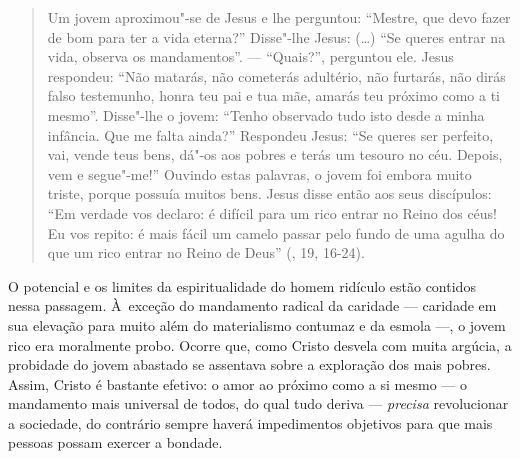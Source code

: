 \begin{quote}
Um jovem aproximou"-se de Jesus e lhe perguntou: ``Mestre, que devo fazer
de bom para ter a vida eterna?'' Disse"-lhe Jesus: (\ldots) ``Se queres
entrar na vida, observa os mandamentos''. --- ``Quais?'', perguntou ele.
Jesus respondeu: ``Não matarás, não cometerás adultério, não furtarás,
não dirás falso testemunho, honra teu pai e tua mãe, amarás teu próximo
como a ti mesmo''. Disse"-lhe o jovem: ``Tenho observado tudo isto desde
a minha infância. Que me falta ainda?'' Respondeu Jesus: ``Se queres ser
perfeito, vai, vende teus bens, dá"-os aos pobres e terás um tesouro no
céu. Depois, vem e segue"-me!'' Ouvindo estas palavras, o jovem foi
embora muito triste, porque possuía muitos bens. Jesus disse então aos
seus discípulos: ``Em verdade vos declaro: é difícil para um rico entrar
no Reino dos céus! Eu vos repito: é mais fácil um camelo passar pelo
fundo de uma agulha do que um rico entrar no Reino de Deus'' (,
19, 16-24).
\end{quote}

O potencial e os limites da espiritualidade do homem ridículo estão
contidos nessa passagem. À~exceção do mandamento radical da caridade ---
caridade em sua elevação para muito além do materialismo contumaz e da
esmola ---, o jovem rico era moralmente probo. Ocorre que, como Cristo
desvela com muita argúcia, a probidade do jovem abastado se assentava
sobre a exploração dos mais pobres. Assim, Cristo é bastante efetivo: o
amor ao próximo como a si mesmo --- o mandamento mais universal de todos,
do qual tudo deriva --- \emph{precisa} revolucionar a sociedade, do
contrário sempre haverá impedimentos objetivos para que mais pessoas
possam exercer a bondade.

